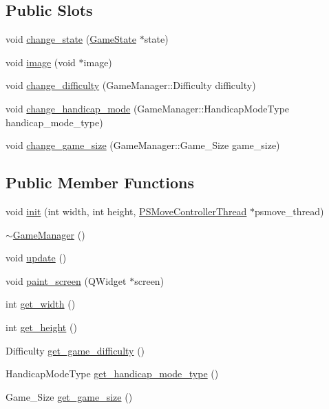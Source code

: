 \subsection*{Public Slots}
\begin{DoxyCompactItemize}
\item 
void \hyperlink{class_game_manager_a60d891c730d679638699313b32554fc3}{change\-\_\-state} (\hyperlink{class_game_state}{Game\-State} $\ast$state)
\item 
void \hyperlink{class_game_manager_a95f0287ced8a2bc8d27fb5ec1a65eff2}{image} (void $\ast$image)
\item 
void \hyperlink{class_game_manager_ae9c52fcc0f8b739437a552766d46ba17}{change\-\_\-difficulty} (Game\-Manager\-::\-Difficulty difficulty)
\item 
void \hyperlink{class_game_manager_a8a5d97b0e6ed557b7f69940bb0952512}{change\-\_\-handicap\-\_\-mode} (Game\-Manager\-::\-Handicap\-Mode\-Type handicap\-\_\-mode\-\_\-type)
\item 
void \hyperlink{class_game_manager_a3d3dc17dd64dc88b0dafde6242ff2a7f}{change\-\_\-game\-\_\-size} (Game\-Manager\-::\-Game\-\_\-\-Size game\-\_\-size)
\end{DoxyCompactItemize}
\subsection*{Public Member Functions}
\begin{DoxyCompactItemize}
\item 
void \hyperlink{class_game_manager_a20ffdea8c56aa5d364554aa04eace73b}{init} (int width, int height, \hyperlink{class_p_s_move_controller_thread}{P\-S\-Move\-Controller\-Thread} $\ast$psmove\-\_\-thread)
\item 
\hyperlink{class_game_manager_aaae63e38e358379c1fe507c5197a8435}{$\sim$\-Game\-Manager} ()
\item 
void \hyperlink{class_game_manager_a7ecc3a14cd9e92f50729b37d1364953f}{update} ()
\item 
void \hyperlink{class_game_manager_adc2d500cc9ec8eaad8b9414b8eeffc97}{paint\-\_\-screen} (Q\-Widget $\ast$screen)
\item 
int \hyperlink{class_game_manager_a2c3a78c8ea991f7bdc2e7e935c791a88}{get\-\_\-width} ()
\item 
int \hyperlink{class_game_manager_a610beadc7ccea38d546dd17278e05a76}{get\-\_\-height} ()
\item 
Difficulty \hyperlink{class_game_manager_a67f07b08a9ecc6583af8c7d72682308a}{get\-\_\-game\-\_\-difficulty} ()
\item 
Handicap\-Mode\-Type \hyperlink{class_game_manager_a2b7b0e2c66eb7fcdfad952dffa108a3c}{get\-\_\-handicap\-\_\-mode\-\_\-type} ()
\item 
Game\-\_\-\-Size \hyperlink{class_game_manager_a3a2dcb0df5fd21caa872d68378311578}{get\-\_\-game\-\_\-size} ()
\end{DoxyCompactItemize}
